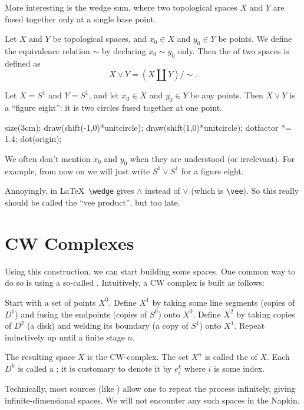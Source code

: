 \documentclass[11pt]{scrreprt}
\begin{document}
More interesting is the wedge sum, where two topological spaces $X$
and $Y$ are fused together only at a single base point.
\begin{definition}
	Let $X$ and $Y$ be topological spaces, and $x_0 \in X$ and $y_0 \in Y$
	be points.
	We define the equivalence relation $\sim$ by declaring $x_0 \sim y_0$ only.
	Then the  of two spaces is defined as
	\[ X \vee Y = (X \amalg Y) / {\sim}. \]
\end{definition}

\begin{example}
	Let $X = S^1$ and $Y = S^1$,
	and let $x_0 \in X$ and $y_0 \in Y$ be any points.
	Then $X \vee Y$ is a ``figure eight'': it is two
	circles fused together at one point.
	\begin{center}
		\begin{asy}
			size(3cm);
			draw(shift(-1,0)*unitcircle);
			draw(shift(1,0)*unitcircle);
			dotfactor *= 1.4;
			dot(origin);
		\end{asy}
	\end{center}
\end{example}
\begin{abuse}
	We often don't mention $x_0$ and $y_0$ when they are understood
	(or irrelevant).  For example, from now on we will just
	write $S^1 \vee S^1$ for a figure eight.
\end{abuse}

\begin{remark}
	Annoyingly, in \LaTeX\ \verb+\wedge+ gives $\wedge$ instead
	of $\vee$ (which is \verb+\vee+).
	So this really should be called the ``vee product'', but too late.
\end{remark}


\section{CW Complexes}
Using this construction, we can start building some spaces.
One common way to do so is using a so-called .
Intuitively, a CW complex is built as follows:
\begin{itemize}
	\ii Start with a set of points $X^0$.
	\ii Define $X^1$ by taking some line segments (copies of $D^1$)
	and fusing the endpoints (copies of $S^0$) onto $X^0$.
	\ii Define $X^2$ by taking copies of $D^2$ (a disk)
	and welding its boundary (a copy of $S^1$) onto $X^1$.
	\ii Repeat inductively up until a finite stage $n$.
\end{itemize}
The resulting space $X$ is the CW-complex.
The set $X^n$ is called the  of $X$.
Each $D^k$ is called a ; it is customary to
denote it by $e_i^k$ where $i$ is some index.
\begin{abuse}
	Technically, most sources (like \cite{ref:hatcher}) allow one to
	repeat the process infinitely, giving infinite-dimensional spaces.
	We will not encounter any such spaces in the Napkin.
\end{abuse}
\end{document}

